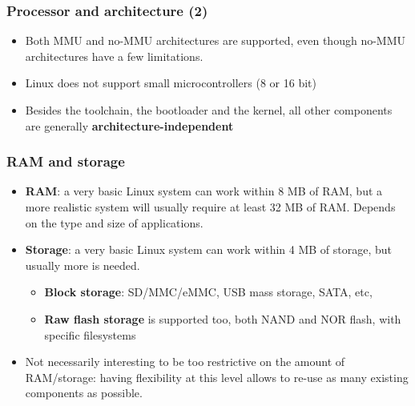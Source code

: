 \begin{frame}
  \frametitle{Processor and architecture (2)}
  \begin{itemize}
  \item Both MMU and no-MMU architectures are supported, even though
    no-MMU architectures have a few limitations.
  \item Linux does not support small microcontrollers (8 or 16 bit)
  \item Besides the toolchain, the bootloader and the kernel, all
    other components are generally {\bf architecture-independent}
  \end{itemize}
\end{frame}

\begin{frame}
  \frametitle{RAM and storage}
  \begin{itemize}
  \item {\bf RAM}: a very basic Linux system can work within 8 MB of
    RAM, but a more realistic system will usually require at least 32
    MB of RAM. Depends on the type and size of applications.
  \item {\bf Storage}: a very basic Linux system can work within 4 MB
    of storage, but usually more is needed.
    \begin{itemize}
    \item {\bf Block storage}: SD/MMC/eMMC, USB mass storage, SATA, etc,
    \item {\bf Raw flash storage} is supported too, both NAND and NOR flash, with
      specific filesystems
    \end{itemize}
  \item Not necessarily interesting to be too restrictive on the
    amount of RAM/storage: having flexibility at this level allows to
    re-use as many existing components as possible.
  \end{itemize}
\end{frame}


